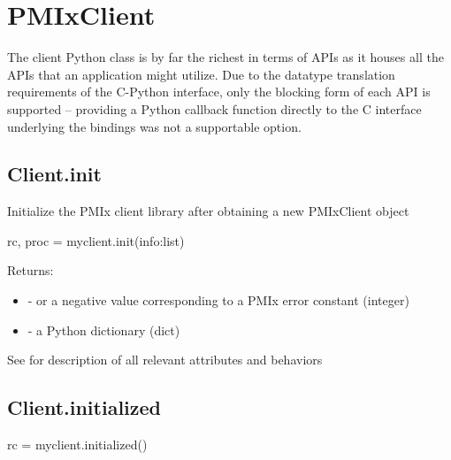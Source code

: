 \section{PMIxClient}
\label{app:python:client}

The client Python class is by far the richest in terms of \acp{API} as it houses all the \acp{API} that an application might utilize. Due to the datatype translation requirements of the C-Python interface, only the blocking form of each \ac{API} is supported – providing a Python callback function directly to the C interface underlying the bindings was not a supportable option.

\subsection{Client.init}

\summary Initialize the \ac{PMIx} client library after obtaining a new PMIxClient object

\format

\pyspecificstart
\begin{codepar}
rc, proc = myclient.init(info:list)
\end{codepar}
\pyspecificend


\begin{arglist}
\end{arglist}

Returns:

\begin{itemize}
    \item {} -  or a negative value corresponding to a PMIx error constant (integer)
    \item {} - a Python  dictionary (dict)
\end{itemize}


See  for description of all relevant attributes and behaviors

\subsection{Client.initialized}

\format

\pyspecificstart
\begin{codepar}
rc = myclient.initialized()
\end{codepar}
\pyspecificend



